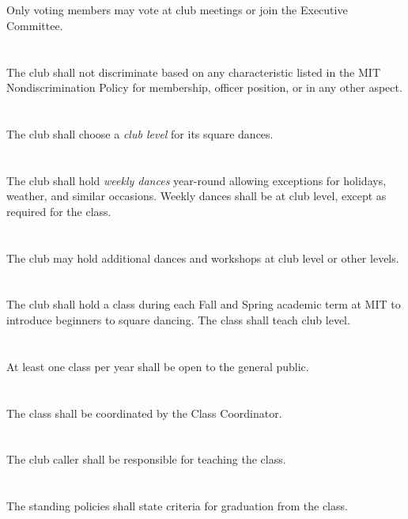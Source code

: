 \documentclass{bylaws}
\begin{document}
\section{}Only voting members may vote at club meetings or join the Executive Committee.
\section{}The club shall not discriminate based on any characteristic listed in the MIT Nondiscrimination Policy for membership, officer position, or in any other aspect.


\section{}The club shall choose a \textit{club level} for its square dances.
\section{}The club shall hold \textit{weekly dances} year-round allowing exceptions for holidays, weather, and similar occasions. Weekly dances shall be at club level, except as required for the class.
\section{}The club may hold additional dances and workshops at club level or other levels.


\section{}The club shall hold a class during each Fall and Spring academic term at MIT to introduce beginners to square dancing. The class shall teach club level.
\section{}At least one class per year shall be open to the general public.
\section{}The class shall be coordinated by the Class Coordinator.
\section{}The club caller shall be responsible for teaching the class.
\section{}The standing policies shall state criteria for graduation from the class.
\end{document}
